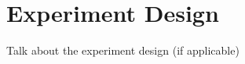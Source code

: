 \section{Experiment Design} \label{sec:experiment}
\color{red}
Talk about the experiment design (if applicable)
\color{black}